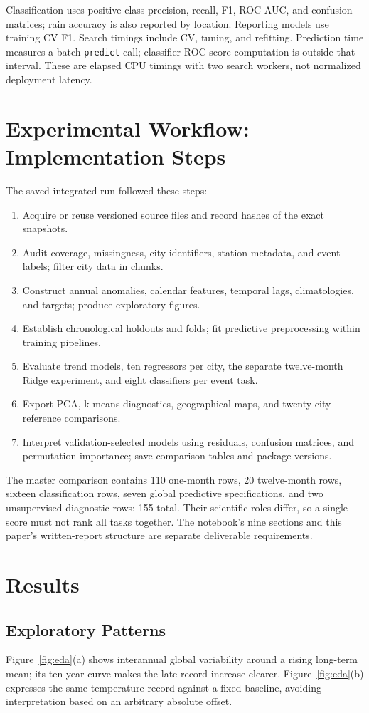 \documentclass[conference]{IEEEtran}
\begin{document}
Classification uses positive-class precision, recall, F1, ROC-AUC, and confusion matrices; rain accuracy is also reported by location. Reporting models use training CV F1. Search timings include CV, tuning, and refitting. Prediction time measures a batch \texttt{predict} call; classifier ROC-score computation is outside that interval. These are elapsed CPU timings with two search workers, not normalized deployment latency.

\section{Experimental Workflow: Implementation Steps}
The saved integrated run followed these steps:
\begin{enumerate}[leftmargin=*,itemsep=2pt]
\item Acquire or reuse versioned source files and record hashes of the exact snapshots.
\item Audit coverage, missingness, city identifiers, station metadata, and event labels; filter city data in chunks.
\item Construct annual anomalies, calendar features, temporal lags, climatologies, and targets; produce exploratory figures.
\item Establish chronological holdouts and folds; fit predictive preprocessing within training pipelines.
\item Evaluate trend models, ten regressors per city, the separate twelve-month Ridge experiment, and eight classifiers per event task.
\item Export PCA, k-means diagnostics, geographical maps, and twenty-city reference comparisons.
\item Interpret validation-selected models using residuals, confusion matrices, and permutation importance; save comparison tables and package versions.
\end{enumerate}
The master comparison contains 110 one-month rows, 20 twelve-month rows, sixteen classification rows, seven global predictive specifications, and two unsupervised diagnostic rows: 155 total. Their scientific roles differ, so a single score must not rank all tasks together. The notebook's nine sections and this paper's written-report structure are separate deliverable requirements.

\section{Results}
\subsection{Exploratory Patterns}
Figure~\ref{fig:eda}(a) shows interannual global variability around a rising long-term mean; its ten-year curve makes the late-record increase clearer. Figure~\ref{fig:eda}(b) expresses the same temperature record against a fixed baseline, avoiding interpretation based on an arbitrary absolute offset.
\end{document}
